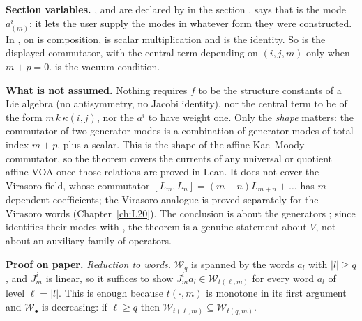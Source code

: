 \begin{dictionary}
\textbf{Section variables.} ,  and
 are declared by  in the section .  says
that  is the mode $a^i_{(m)}$; it lets the user supply the modes in whatever form they were constructed. In
, \lean{*} on  is composition,  is scalar multiplication and  is the
identity. So  is the displayed commutator, with the central term depending on $(i,j,m)$ only when
$m+p=0$.  is the vacuum condition.

\textbf{What is not assumed.} Nothing requires $f$ to be the structure constants of a Lie algebra (no antisymmetry, no
Jacobi identity), nor the central term to be of the form $m\,k\,\kappa(i,j)$, nor the $a^i$ to have weight one. Only the
\emph{shape} matters: the commutator of two generator modes is a combination of generator modes of total index $m+p$, plus
a scalar. This is the shape of the affine Kac--Moody commutator, so the theorem covers the currents of any universal or
quotient affine VOA once those relations are proved in Lean. It does not cover the Virasoro field, whose commutator
$[L_m,L_n] = (m-n)L_{m+n}+\dots$ has $m$-dependent coefficients; the Virasoro analogue is proved separately for the
Virasoro words (Chapter~\ref{ch:L20}). The conclusion is about the generators ; since  identifies
their modes with , the theorem is a genuine statement about $V$, not about an auxiliary family of operators.
\end{dictionary}

\textbf{Proof on paper.} \emph{Reduction to words.} $\mathcal W_q$ is spanned by the words $a_l$ with $|l|\ge q$, and
$J^i_m$ is linear, so it suffices to show $J^i_ma_l\in\mathcal W_{t(\ell,m)}$ for every word $a_l$ of level $\ell = |l|$.
This is enough because $t(\cdot,m)$ is monotone in its first argument and $\mathcal W_\bullet$ is decreasing: if
$\ell\ge q$ then $\mathcal W_{t(\ell,m)}\subseteq\mathcal W_{t(q,m)}$.

